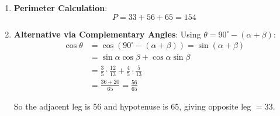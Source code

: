 \documentclass[12pt]{article}
\begin{document}
\begin{keyinsightbox}
\begin{enumerate}
    \item \textbf{Perimeter Calculation}:
    $$P = 33 + 56 + 65 = 154$$
    
    \item \textbf{Alternative via Complementary Angles}: Using $\theta = 90^{\circ} - (\alpha + \beta)$:
    \begin{align*}
        \cos\theta &= \cos(90^{\circ} - (\alpha + \beta)) = \sin(\alpha + \beta) \\
        &= \sin\alpha \cos\beta + \cos\alpha \sin\beta \\
        &= \frac{3}{5} \cdot \frac{12}{13} + \frac{4}{5} \cdot \frac{5}{13} \\
        &= \frac{36 + 20}{65} = \frac{56}{65}
    \end{align*}
    
    So the adjacent leg is 56 and hypotenuse is 65, giving opposite leg $= 33$.
\end{enumerate}
\end{keyinsightbox}
\end{document}
